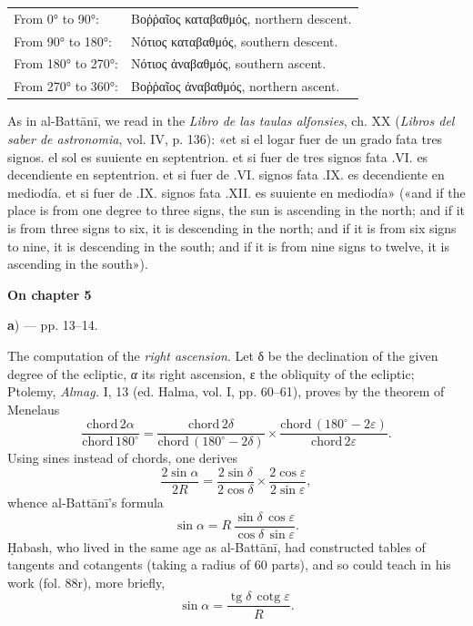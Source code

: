 \documentclass[11pt]{article}
\newcommand{\UnitHead}[2]{\par\setcounter{footnoteT}{0}\needspace{8\baselineskip}\bigskip\pdfbookmark[1]{#1}{unit-#2}\hypertarget{EN-#2}{}%
 {\large\bfseries\interlinepenalty=10000 #1\par}\nobreak\medskip}
\begin{document}
\begin{center}\small\begin{tabular}{ll}
From 0° to 90°: & {\greekfont Βοῤῥαῖος καταβαθμός}, northern descent. \\
From 90° to 180°: & {\greekfont Νότιος καταβαθμός}, southern descent. \\
From 180° to 270°: & {\greekfont Νότιος ἀναβαθμός}, southern ascent. \\
From 270° to 360°: & {\greekfont Βοῤῥαῖος ἀναβαθμός}, northern ascent. \\
\end{tabular}\end{center}
\par As in al-Battānī, we read in the \emph{Libro de las taulas alfonsies}, ch. XX (\emph{Libros del saber de astronomia}, vol. IV, p. 136): «et si el logar fuer de un grado fata tres signos. el sol es suuiente en septentrion. et si fuer de tres signos fata .VI. es decendiente en septentrion. et si fuer de .VI. signos fata .IX. es decendiente en mediodía. et si fuer de .IX. signos fata .XII. es suuiente en mediodía» («and if the place is from one degree to three signs, the sun is ascending in the north; and if it is from three signs to six, it is descending in the north; and if it is from six signs to nine, it is descending in the south; and if it is from nine signs to twelve, it is ascending in the south»).\par
\UnitHead{On chapter 5}{A05}
\par\begin{center}\textbf{a}) — pp. 13–14.\end{center}
\par The computation of the \emph{right ascension}. Let {\greekfont δ} be the declination of the given degree of the ecliptic, \emph{{\greekfont α}} its right ascension, {\greekfont ε} the obliquity of the ecliptic; Ptolemy, \emph{Almag.} I, 13 (ed. Halma, vol. I, pp. 60–61), proves by the theorem of Menelaus \[ \frac{\text{chord}\,2\alpha}{\text{chord}\,180^\circ} = \frac{\text{chord}\,2\delta}{\text{chord}\,(180^\circ - 2\delta)} \times \frac{\text{chord}\,(180^\circ - 2\varepsilon)}{\text{chord}\,2\varepsilon}. \] Using sines instead of chords, one derives \[ \frac{2\sin\alpha}{2R} = \frac{2\sin\delta}{2\cos\delta} \times \frac{2\cos\varepsilon}{2\sin\varepsilon}, \] whence al-Battānī's formula \[ \sin\alpha = R\,\frac{\sin\delta\,\cos\varepsilon}{\cos\delta\,\sin\varepsilon}. \] Ḥabash, who lived in the same age as al-Battānī, had constructed tables of tangents and cotangents (taking a radius of 60 parts), and so could teach in his work (fol. 88r), more briefly, \[ \sin\alpha = \frac{\operatorname{tg}\delta\,\operatorname{cotg}\varepsilon}{R}. \]\par
\end{document}
